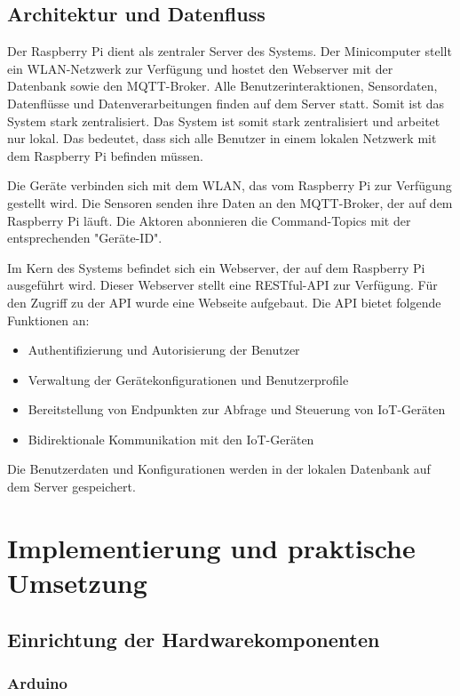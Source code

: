 \documentclass[12pt, letterpaper]{article}
\begin{document}
\subsection{Architektur und Datenfluss}
\par Der Raspberry Pi dient als zentraler Server des Systems. Der Minicomputer stellt ein WLAN-Netzwerk zur Verfügung und hostet den Webserver mit der Datenbank sowie den MQTT-Broker. Alle Benutzerinteraktionen, Sensordaten, Datenflüsse und Datenverarbeitungen finden auf dem Server statt. Somit ist das System stark zentralisiert. Das System ist somit stark zentralisiert und arbeitet nur lokal. Das bedeutet, dass sich alle Benutzer in einem lokalen Netzwerk mit dem Raspberry Pi befinden müssen. 
\par Die Geräte verbinden sich mit dem WLAN, das vom Raspberry Pi zur Verfügung gestellt wird. Die Sensoren senden ihre Daten an den MQTT-Broker, der auf dem Raspberry Pi läuft. Die Aktoren abonnieren die Command-Topics mit der entsprechenden "Geräte-ID".
\par Im Kern des Systems befindet sich ein Webserver, der auf dem Raspberry Pi ausgeführt wird. Dieser Webserver stellt eine RESTful-API zur Verfügung. Für den Zugriff zu der API wurde eine Webseite aufgebaut. Die API bietet folgende Funktionen an:
\begin{itemize}
  \item Authentifizierung und Autorisierung der Benutzer
  \item Verwaltung der Gerätekonfigurationen und Benutzerprofile
  \item Bereitstellung von Endpunkten zur Abfrage und Steuerung von IoT-Geräten
  \item Bidirektionale Kommunikation mit den IoT-Geräten
\end{itemize}
\par Die Benutzerdaten und Konfigurationen werden in der lokalen Datenbank auf dem Server gespeichert. 
\par 
\newpage
\section{Implementierung und praktische Umsetzung}
\subsection{Einrichtung der Hardwarekomponenten}
  \subsubsection{Arduino}
\end{document}
